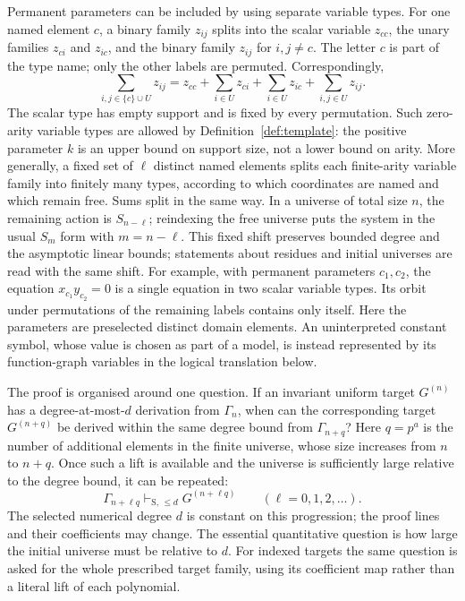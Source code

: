 \documentclass[11pt,a4paper]{article}
\theoremstyle{definition}\newtheorem{definition}[theorem]{Definition}
\theoremstyle{remark}\newtheorem{remark}[theorem]{Remark}
\begin{document}
Permanent parameters can be included by using separate variable types.
For one named element $c$, a binary family $z_{ij}$ splits into the
scalar variable $z_{cc}$, the unary families $z_{ci}$ and $z_{ic}$,
and the binary family $z_{ij}$ for $i,j\ne c$. The letter $c$ is part
of the type name; only the other labels are permuted. Correspondingly,
\[
 \sum_{i,j\in\{c\}\cup U}z_{ij}
 =z_{cc}+\sum_{i\in U}z_{ci}+\sum_{i\in U}z_{ic}
                                      +\sum_{i,j\in U}z_{ij}.
\]
The scalar type has empty support and is fixed by every permutation.
Such zero-arity variable types are allowed by
Definition~\ref{def:template}: the positive parameter $k$ is an upper
bound on support size, not a lower bound on arity. More generally,
a fixed set of $\ell$ distinct named elements splits each finite-arity
variable family into finitely many types, according to which coordinates
are named and which remain free. Sums split in the same way. In a
universe of total size $n$, the remaining action is $S_{n-\ell}$;
reindexing the free universe puts the system in the usual $S_m$ form
with $m=n-\ell$. This fixed shift preserves bounded degree and the
asymptotic linear bounds; statements about residues and initial universes
are read with the same shift. For example, with permanent parameters
$c_1,c_2$, the equation $x_{c_1}y_{c_2}=0$ is a single equation in two
scalar variable types. Its orbit under permutations of the remaining
labels contains only itself.
Here the parameters are preselected distinct domain elements. An
uninterpreted constant symbol, whose value is chosen as part of a model,
is instead represented by its function-graph variables in the logical
translation below.

The proof is organised around one question. If an invariant uniform
target $G^{(n)}$ has a degree-at-most-$d$ derivation from $\Gamma_n$, when
can the corresponding target $G^{(n+q)}$ be derived within the same
degree bound from $\Gamma_{n+q}$? Here $q=p^a$ is the number of additional
elements in the finite universe, whose size increases from $n$ to $n+q$. Once such a lift is available and the universe is sufficiently large
relative to the degree bound, it can be repeated:
\[
 \Gamma_{n+\ell q}\vdash_{\mathrm S,\,\le d}G^{(n+\ell q)}
                    \qquad(\ell=0,1,2,\ldots).
\]
The selected numerical degree $d$ is constant on this progression;
the proof lines and their coefficients may change. The essential
quantitative question is how large the initial universe must be relative
to $d$. For indexed targets the same question is asked for the whole
prescribed target family, using its coefficient map rather than a
literal lift of each polynomial.
\end{document}
